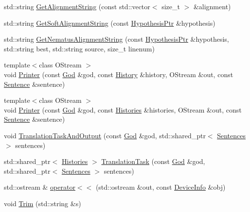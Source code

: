 \begin{DoxyCompactItemize}
\item 
std\+::string \hyperlink{namespaceamunmt_a33109e5a2b2adf93a3e60ef4197a85f9}{Get\+Alignment\+String} (const std\+::vector$<$ size\+\_\+t $>$ \&alignment)
\item 
std\+::string \hyperlink{namespaceamunmt_a2cb8f571957aa136afe5b74340ecec52}{Get\+Soft\+Alignment\+String} (const \hyperlink{namespaceamunmt_a9dd9d255e51649b0af19d0e895d52d2f}{Hypothesis\+Ptr} \&hypothesis)
\item 
std\+::string \hyperlink{namespaceamunmt_a589013f9c66aae2070326dc22d2b547d}{Get\+Nematus\+Alignment\+String} (const \hyperlink{namespaceamunmt_a9dd9d255e51649b0af19d0e895d52d2f}{Hypothesis\+Ptr} \&hypothesis, std\+::string best, std\+::string source, size\+\_\+t linenum)
\item 
{\footnotesize template$<$class O\+Stream $>$ }\\void \hyperlink{namespaceamunmt_aef108281493b0c3b669c537192eace34}{Printer} (const \hyperlink{classamunmt_1_1God}{God} \&god, const \hyperlink{classamunmt_1_1History}{History} \&history, O\+Stream \&out, const \hyperlink{classamunmt_1_1Sentence}{Sentence} \&sentence)
\item 
{\footnotesize template$<$class O\+Stream $>$ }\\void \hyperlink{namespaceamunmt_a10b27c18333dd8e5b6652acfea64d7d2}{Printer} (const \hyperlink{classamunmt_1_1God}{God} \&god, const \hyperlink{classamunmt_1_1Histories}{Histories} \&histories, O\+Stream \&out, const \hyperlink{classamunmt_1_1Sentence}{Sentence} \&sentence)
\item 
void \hyperlink{namespaceamunmt_aac616d7d6dd75bad96a6dcf3afe74e85}{Translation\+Task\+And\+Output} (const \hyperlink{classamunmt_1_1God}{God} \&god, std\+::shared\+\_\+ptr$<$ \hyperlink{classamunmt_1_1Sentences}{Sentences} $>$ sentences)
\item 
std\+::shared\+\_\+ptr$<$ \hyperlink{classamunmt_1_1Histories}{Histories} $>$ \hyperlink{namespaceamunmt_a54e0c0c0dd1caecba5c17e45d023fd5e}{Translation\+Task} (const \hyperlink{classamunmt_1_1God}{God} \&god, std\+::shared\+\_\+ptr$<$ \hyperlink{classamunmt_1_1Sentences}{Sentences} $>$ sentences)
\item 
std\+::ostream \& \hyperlink{namespaceamunmt_aa685f28fda5503ea31605ee8812e9f86}{operator$<$$<$} (std\+::ostream \&out, const \hyperlink{structamunmt_1_1DeviceInfo}{Device\+Info} \&obj)
\item 
void \hyperlink{namespaceamunmt_a4578e863aaec8293556404432d7e8d04}{Trim} (std\+::string \&s)
\item 

\end{DoxyCompactItemize}
